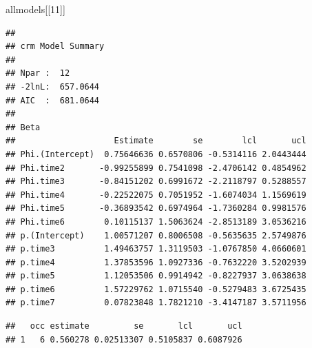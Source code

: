 \documentclass[
]{article}
\newenvironment{Shaded}{\begin{snugshade}}{\end{snugshade}}
\newcommand{\CommentTok}[1]{\textcolor[rgb]{0.56,0.35,0.01}{\textit{#1}}}
\newcommand{\DecValTok}[1]{\textcolor[rgb]{0.00,0.00,0.81}{#1}}
\newcommand{\DocumentationTok}[1]{\textcolor[rgb]{0.56,0.35,0.01}{\textbf{\textit{#1}}}}
\newcommand{\FunctionTok}[1]{\textcolor[rgb]{0.00,0.00,0.00}{#1}}
\newcommand{\NormalTok}[1]{#1}
\newcommand{\SpecialCharTok}[1]{\textcolor[rgb]{0.00,0.00,0.00}{#1}}
\begin{document}
\begin{Shaded}
\begin{Highlighting}[]
\NormalTok{allmodels[[}\DecValTok{11}\NormalTok{]]}
\end{Highlighting}
\end{Shaded}

\begin{verbatim}
## 
## crm Model Summary
## 
## Npar :  12
## -2lnL:  657.0644
## AIC  :  681.0644
## 
## Beta
##                    Estimate        se        lcl       ucl
## Phi.(Intercept)  0.75646636 0.6570806 -0.5314116 2.0443444
## Phi.time2       -0.99255899 0.7541098 -2.4706142 0.4854962
## Phi.time3       -0.84151202 0.6991672 -2.2118797 0.5288557
## Phi.time4       -0.22522075 0.7051952 -1.6074034 1.1569619
## Phi.time5       -0.36893542 0.6974964 -1.7360284 0.9981576
## Phi.time6        0.10115137 1.5063624 -2.8513189 3.0536216
## p.(Intercept)    1.00571207 0.8006508 -0.5635635 2.5749876
## p.time3          1.49463757 1.3119503 -1.0767850 4.0660601
## p.time4          1.37853596 1.0927336 -0.7632220 3.5202939
## p.time5          1.12053506 0.9914942 -0.8227937 3.0638638
## p.time6          1.57229762 1.0715540 -0.5279483 3.6725435
## p.time7          0.07823848 1.7821210 -3.4147187 3.5711956
\end{verbatim}

\begin{Shaded}
\end{Shaded}

\begin{verbatim}
##   occ estimate         se       lcl       ucl
## 1   6 0.560278 0.02513307 0.5105837 0.6087926
\end{verbatim}
\end{document}
